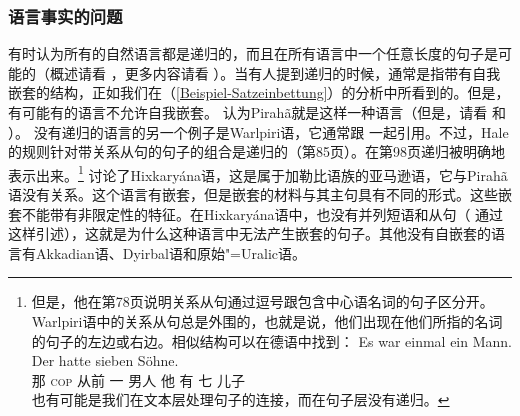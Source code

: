 \subsubsection{语言事实的问题}

有时认为所有的自然语言都是递归的，而且在所有语言中一个任意长度的句子是可能的（概述请看\citealp*[]{HNG2005a} ，更多内容请看 ）。当有人提到递归的时候，通常是指带有自我嵌套的结构，正如我们在（\ref{Beispiel-Satzeinbettung}）的分析中所看到的\citep{Fitch2010a}。但是，有可能有的语言不允许自我嵌套。 \citet{Everett2005a-u}认为Pirah{\~a}就是这样一种语言（但是，请看 和
 ）。
没有递归的语言的另一个例子是Warlpiri语，它通常跟 一起引用。不过，Hale的规则针对带关系从句的句子的组合是递归的（第85页）。在第98页递归被明确地表示出来。\footnote{%
但是，他在第78页说明关系从句通过逗号跟包含中心语名词的句子区分开。Warlpiri语中的关系从句总是外围的，也就是说，他们出现在他们所指的名词的句子的左边或右边。相似结构可以在德语中找到：
\ea
\gll Es war einmal ein Mann. Der hatte sieben Söhne.\\
	 那 \textsc{cop}  从前 一 男人 他 有 七 儿子\\
\z
也有可能是我们在文本层处理句子的连接，而在句子层没有递归。
} \citet[]{PS2010a}讨论了Hixkaryána语，这是属于加勒比语族的亚马逊语，它与Pirah{\~a}语没有关系。这个语言有嵌套，但是嵌套的材料与其主句具有不同的形式。这些嵌套不能带有非限定性的特征。在Hixkaryána语中，也没有并列短语和从句（ 通过 这样引述），这就是为什么这种语言中无法产生嵌套的句子。其他没有自嵌套的语言有Akkadian语、Dyirbal语和原始"=Uralic语。
